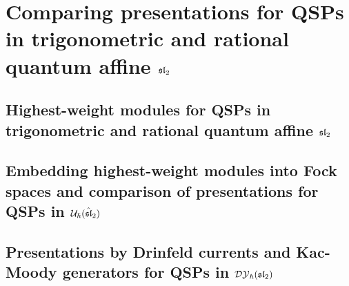 \section{\texorpdfstring{Comparing presentations for QSPs in trigonometric and rational quantum affine $\sl_2$}{}}
    \subsection{\texorpdfstring{Highest-weight modules for QSPs in trigonometric and rational quantum affine $\sl_2$}{}}

    \subsection{\texorpdfstring{Embedding highest-weight modules into Fock spaces and comparison of presentations for QSPs in $\calU_{\hbar}(\hat{\sl}_2)$}{}}

    \subsection{\texorpdfstring{Presentations by Drinfeld currents and Kac-Moody generators for QSPs in $\DY_{\hbar}(\sl_2)$}{}}